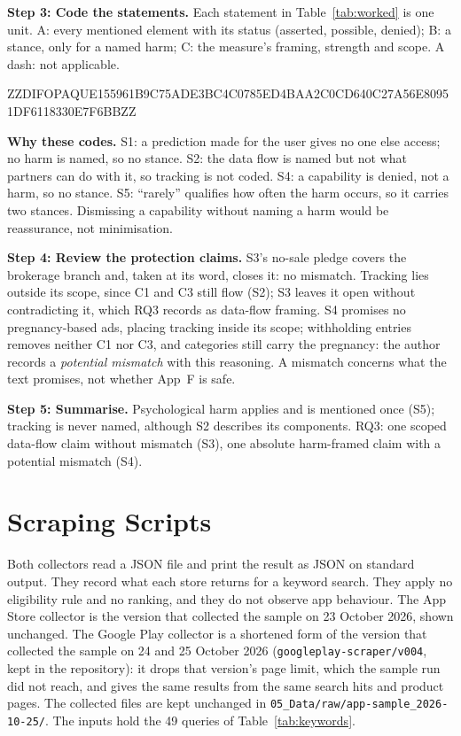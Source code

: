 \documentclass[twoside,its]{bossthesis}
\begin{document}
\textbf{Step 3: Code the statements.} Each statement in Table~\ref{tab:worked}
is one unit. A: every mentioned element with its status (asserted, possible,
denied); B: a stance, only for a named harm; C: the measure's framing,
strength and scope. A dash: not applicable.



ZZDIFOPAQUE155961B9C75ADE3BC4C0785ED4BAA2C0CD640C27A56E80951DF6118330E7F6BBZZ



\noindent\textbf{Why these codes.} S1: a prediction made for the user gives
no one else access; no harm is named, so no stance. S2: the data flow is named
but not what partners can do with it, so tracking is not coded. S4: a
capability is denied, not a harm, so no stance. S5: \enquote{rarely}
qualifies how often the harm occurs, so it carries two stances. Dismissing a
capability without naming a harm would be reassurance, not minimisation.

\textbf{Step 4: Review the protection claims.} S3's no-sale pledge covers the
brokerage branch and, taken at its word, closes it: no mismatch. Tracking lies
outside its scope, since C1 and C3 still flow (S2); S3 leaves it open without
contradicting it, which RQ3 records as data-flow framing. S4 promises no
pregnancy-based ads, placing tracking inside its scope; withholding entries
removes neither C1 nor C3, and categories still carry the pregnancy: the
author records a \emph{potential mismatch} with this reasoning. A mismatch
concerns what the text promises, not whether App~F is safe.

\textbf{Step 5: Summarise.} Psychological harm applies and is mentioned once
(S5); tracking is never named, although S2 describes its components. RQ3: one
scoped data-flow claim without mismatch (S3), one absolute harm-framed claim
with a potential mismatch (S4).



\chapter{Scraping Scripts}
\label{app:scripts}
Both collectors read a JSON file and print the result as JSON on standard
output. They record what each store returns for a keyword search. They apply no
eligibility rule and no ranking, and they do not observe app behaviour. The App
Store collector is the version that collected the sample on 23 October 2026,
shown unchanged. The Google Play collector is a shortened form of the version
that collected the sample on 24 and 25 October 2026
(\texttt{googleplay-scraper/v004}, kept in the repository): it drops that
version's page limit, which the sample run did not reach, and gives the same
results from the same search hits and product pages. The collected files are
kept unchanged in \texttt{05\_Data/raw/app-sample\_2026-10-25/}. The inputs
hold the 49 queries of Table~\ref{tab:keywords}.
\end{document}
